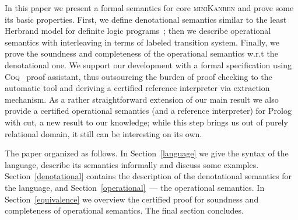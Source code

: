 In this paper we present a formal semantics for core \textsc{miniKanren} and prove some its basic properties. First,
we define denotational semantics similar to the least Herbrand model for definite logic programs~\cite{LHM}; then
we describe operational semantics with interleaving in terms of labeled transition system. Finally, we prove the soundness and
completeness of the operational semantics w.r.t the denotational one. We support our development with a formal specification
using \textsc{Coq}~\cite{Coq} proof assistant, thus outsourcing the burden of proof checking to the automatic tool and
deriving a certified reference interpreter via extraction mechanism. As a rather straightforward extension of our
main result we also provide a certified operational semantics (and a reference interpreter) for Prolog with cut, a new result
to our knowledge; while this step brings us out of purely relational domain, it still can be interesting on its own.

The paper organized as follows. In Section~\ref{language} we give the syntax of the language, describe its semantics
informally and discuss some examples. Section~\ref{denotational} contains the description of the denotational semantics for
the language, and Section~\ref{operational}~--- the operational semantics. In Section~\ref{equivalence} we overview the
certified proof for soundness and completeness of operational semantics. The final section concludes.
